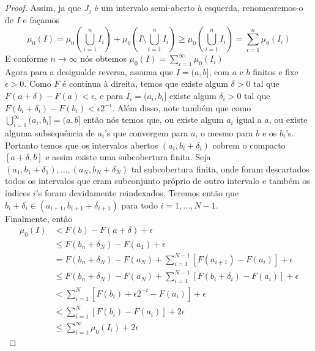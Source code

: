 \begin{proposicao}
\begin{proof}
        Assim, ja que $J_j$ é um intervalo semi-aberto à esquerda, renomearemos-o de $I$ e façamos
        \[
        \mu_0 (I)=\mu_0 (\bigcup _{i=1}^n I_i) +  \mu_0 (I \setminus \bigcup _{i=1}^n I_i) \geq  \mu_0 (\bigcup _{i=1}^n I_i) = \sum _{i=1} ^n \mu_0 (I_i)
        \]
        E conforme $n \to \infty$ nós obtemos $\mu_0(I)=\sum _{i=1} ^\infty \mu_0(I_i)$ \\
        Agora para a desigualde reversa, assuma que $I=(a,b]$, com $a$ e $b$ finitos e fixe $\epsilon>0$. Como $F$ é contínua à direita, temos que existe algum $\delta>0$ tal que $F(a+\delta)-F(a)<\epsilon$, e para $I_i=(a_i,b_i]$ existe algum $\delta_i >0$ tal que $F(b_i+\delta_i)-F(b_i)<\epsilon 2^{-i}$. Além disso, note também que como $\bigcup _{i=1}^\infty(a_i,b_i] = (a,b]$ então nós temos que, ou existe algum $a_i$ igual a $a$, ou existe alguma subsequência de $a_i$'s que convergem para $a$, o mesmo para $b$ e os $b_i$'s. Portanto temos que os intervalos abertos $(a_i,b_i + \delta_i)$ cobrem o compacto $[a + \delta,b]$ e assim existe uma subcobertura finita. Seja $(a_1,b_1 + \delta_1), ... , (a_N,b_N + \delta_N)$ tal subcobertura finita, onde foram descartados todos os intervalos que eram subconjunto próprio de outro intervalo e também os índices $i$'s foram devidamente reindexados. Teremos então que $b_i + \delta_i \in (a_{i+1},b_{i+1} + \delta_{i+1})$ para todo $i=1,...,N-1$. \\
        Finalmente, então 
        \begin{align*}
            \mu_0(I) &< F(b)-F(a+\delta) + \epsilon \\
                     &\leq F(b_n+\delta_N)-F(a_1) + \epsilon \\
                     &= F(b_n+\delta_N)-F(a_N) + \sum_{i=1}^{N-1}[F(a_{i+1}) - F(a_i)] + \epsilon \\ 
                     &\leq F(b_n+\delta_N)-F(a_N) + \sum_{i=1}^{N-1}[F(b_{i} + \delta_i) - F(a_i)] + \epsilon \\
                     &< \sum_{i=1}^{N}[F(b_{i}) + \epsilon 2^{-i} - F(a_i)] + \epsilon \\
                     &< \sum_{i=1}^{N}[F(b_{i}) - F(a_i)] + 2 \epsilon \\
                     &\leq \sum_{i=1} ^\infty \mu_0(I_i) + 2 \epsilon
        \end{align*}
        

\end{proof}
\end{proposicao}
